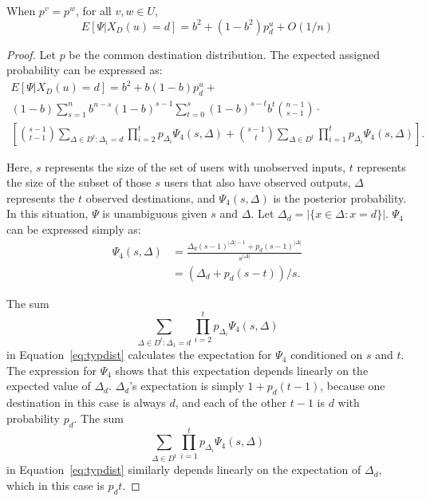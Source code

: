 \documentclass[prodmode,acmtissec]{acmsmall}
\begin{document}
\begin{theorem}
When $p^v = p^w$, for all $v,w\in U$,
\begin{displaymath}
E[\Psi|X_D(u)=d] = b^2+(1-b^2)p^u_d + O(1/n)
\end{displaymath}
\end{theorem}
\begin{proof}
Let $p$ be the common destination distribution.  The expected assigned probability can be expressed as:
\begin{multline} \label{eq:typdist}
E[\Psi|X_D(u)=d] = b^2 + b(1-b)p^u_d +\\
(1-b)\sum_{s=1}^n b^{n-s} (1-b)^{s-1} \sum_{t=0}^{s} (1-b)^{s-t} b^t \binom{n-1}{s-1} \cdot \\
\left[\binom{s-1}{t-1} \sum_{\Delta \in D^t:\Delta_1=d} \prod_{i=2}^t p_{\Delta_i} \Psi_4(s,\Delta) + \binom{s-1}{t} \sum_{\Delta \in D^t} \prod_{i=1}^t p_{\Delta_i} \Psi_4(s,\Delta) \right].
\end{multline}

Here, $s$ represents the size of the set of users with unobserved inputs, $t$ represents the size of the subset of those $s$ users that also have observed outputs, $\Delta$ represents the $t$ observed destinations, and $\Psi_4(s, \Delta)$ is the posterior probability.  In this situation, $\Psi$ is unambiguous given $s$ and $\Delta$.  Let $\Delta_d = |\{x\in \Delta : x=d\}|$.  $\Psi_4$ can be expressed simply as:
\begin{align*}
\Psi_4(s,\Delta) &= \frac{\Delta_d (s-1)^{|\Delta|-1} + p_d (s-1)^{|\Delta|}}{s^{|\Delta|}}\\
&= (\Delta_d + p_d(s-t))/s.
\end{align*}

The sum
\begin{equation*}
\sum_{\Delta \in D^t:\Delta_1=d} \prod_{i=2}^t p_{\Delta_i} \Psi_4(s,\Delta)
\end{equation*}
in Equation~\ref{eq:typdist} calculates the expectation for $\Psi_4$ conditioned on $s$ and $t$.  The expression for $\Psi_4$ shows that this expectation depends linearly on the expected value of $\Delta_d$.  $\Delta_d$'s expectation is simply $1+p_d(t-1)$, because one destination in this case is always $d$, and each of the other $t-1$ is $d$ with probability $p_d$.  The sum
\begin{equation*}
\sum_{\Delta \in D^t} \prod_{i=1}^t p_{\Delta_i} \Psi_4(s,\Delta)
\end{equation*}
in Equation~\ref{eq:typdist} similarly depends linearly on the expectation of $\Delta_d$, which in this case is $p_d t$.


\end{proof}
\end{document}
